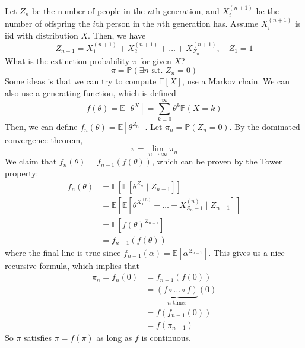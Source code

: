   \begin{example}
    Let $Z_n$ be the number of people in the $n$th generation, and $X_i^{(n+1)}$ be the number of offspring the $i$th person in the $n$th generation has. Assume $X_i^{(n+1)}$ is iid with distribution $X$. Then, we have 
    \begin{equation}
      Z_{n+1} = X_1^{(n+1)} + X_2^{(n+1)} + \ldots + X_{Z_n}^{(n + 1)}, \quad Z_1 = 1
    \end{equation}
    What is the extinction probability $\pi$ for given $X$? 
    \begin{equation}
      \pi = \mathbb{P}(\exists n \text{ s.t. } Z_n = 0)
    \end{equation}
    Some ideas is that we can try to compute $\mathbb{E}[X]$, use a Markov chain. We can also use a generating function, which is defined 
    \begin{equation}
      f(\theta) = \mathbb{E} [\theta^X] = \sum_{k=0}^\infty \theta^k \mathbb{P}(X = k)
    \end{equation}
    Then, we can define $f_n (\theta) = \mathbb{E}[\theta^{Z_n}]$. Let $\pi_n = \mathbb{P}(Z_n = 0)$. By the dominated convergence theorem, 
    \begin{equation}
      \pi = \lim_{n \to \infty} \pi_n
    \end{equation} 
    We claim that $f_n (\theta) = f_{n-1} (f(\theta))$, which can be proven by the Tower property:
    \begin{align}
      f_n (\theta) & = \mathbb{E}[ \mathbb{E}[\theta^{Z_n} \mid Z_{n-1}]] \\ 
                   & = \mathbb{E}[ \mathbb{E}[\theta^{X_1^{(n)}} + \ldots + X_{Z_n - 1}^{(n)} \mid Z_{n-1}] ] \\ 
                   & = \mathbb{E}[f(\theta)^{Z_{n-1}}] \\ 
                   & = f_{n-1} (f(\theta))
    \end{align}
    where the final line is true since $f_{n-1} (\alpha) = \mathbb{E}[\alpha^{Z_{n-1}}]$. This gives us a nice recursive formula, which implies that 
    \begin{align}
      \pi_n = f_n (0) & = f_{n-1} (f (0))  \\
                      & = \underbrace{(f \circ \ldots \circ f)}_{n \text{ times}} (0) \\ 
                      & = f(f_{n-1} (0)) \\ 
                      & = f(\pi_{n-1}) 
    \end{align}
    So $\pi$ satisfies $\pi = f(\pi)$ as long as $f$ is continuous. 


\end{example}

